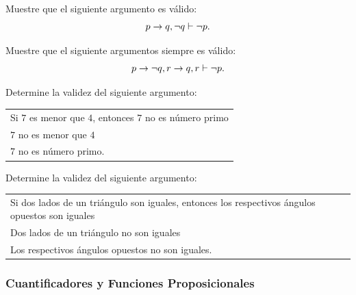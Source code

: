 \documentclass[xcolor={svgnames},
  hyperref={colorlinks}, 
  spanish, 12pt]{beamer}
\numberwithin{equation}{section} %
\numberwithin{figure}{section} %
\begin{document}
\begin{frame}
 \begin{solved}
  Muestre que el siguiente argumento es v\'alido:
 $$
 p\rightarrow q, \neg q \vdash \neg p.
 $$
 \end{solved}

\end{frame}

\begin{frame}
\begin{solved}
  Muestre que el siguiente argumentos siempre es v\'alido:
 $$
 p \rightarrow \neg q, r \rightarrow q, r \vdash \neg p.
 $$
\end{solved}

\end{frame}

\begin{frame}
 \begin{solved}
  Determine la validez del siguiente argumento:
  \begin{center}
\begin{tabular}{l}
Si $7$ es menor que $4$, entonces $7$ no es n\'umero primo\\
$7$ no es menor que $4$\\\hline
$7$ no es n\'umero primo.
  \end{tabular}
  \end{center}

 \end{solved}

\end{frame}

\begin{frame}
 \begin{solved}
  Determine la validez del siguiente argumento:
  \begin{center}
\begin{tabular}{l}
Si dos lados de un tri\'angulo son iguales, entonces los respectivos \'angulos opuestos son iguales\\
Dos lados de un tri\'angulo no son iguales\\\hline
Los respectivos \'angulos opuestos no son iguales.
  \end{tabular}
  \end{center}

 \end{solved}

\end{frame}

\subsubsection{Cuantificadores y Funciones Proposicionales}
\end{document}

